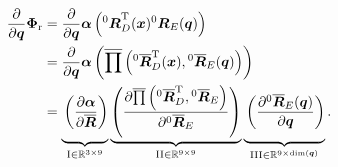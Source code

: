 \documentclass[robotics,article,submit,moreauthors,pdftex]{Definitions/mdpi}
\newcommand{\bm}[1]{\boldsymbol{#1}}
\newcommand{\rotmat}[2]{{{ }^{#1}\boldsymbol{R}}_{#2}}
\newcommand{\rotmato}[2]{{{ }^{#1}\boldsymbol{\overline{R}}}_{#2}}
\newcommand{\transp}[0]{{\mathrm{T}}}
\begin{document}
\begin{align}
\frac{\partial}{\partial \bm{q}}\bm{\Phi}_{\mathrm{r}}
&=
\frac{\partial}{\partial \bm{q}} \bm{\alpha}\left(\rotmat{0}{D}^\transp(\bm{x}) \rotmat{0}{E}(\bm{q})\right) \label{equ:grad_Phi_q}\\
&=
\frac{\partial}{\partial \bm{q}} \bm{\alpha}\left(\overline{\prod}\left( \rotmato{0}{D}^\transp(\bm{x}), \rotmato{0}{E}(\bm{q})\right)\right) \nonumber \\
&=
\underbrace{\vphantom{\left(\frac{\partial \overline{\prod}\left(\rotmato{0}{D}^\transp, \rotmato{0}{E}\right)}{\partial \rotmato{0}{E}}\right)}\left(\frac{\partial \bm{\alpha}}{\partial \overline{\bm{R}}}\right)}_{\mathrm{I} \in {\mathbb{R}}^{3 \times 9}}
\underbrace{\left(\frac{\partial \overline{\prod}\left(\rotmato{0}{D}^\transp, \rotmato{0}{E}\right)}{\partial \rotmato{0}{E}}\right)}_{\mathrm{II} \in {\mathbb{R}}^{9 \times 9}}
\underbrace{\vphantom{\left(\frac{\partial \overline{\prod}\left(\rotmato{0}{D}^\transp, \rotmato{0}{E}\right)}{\partial \rotmato{0}{E}}\right)}\left(\frac{\partial \rotmato{0}{E}(\bm{q})}{\partial \bm{q}} \right)}_{\mathrm{III} \in {\mathbb{R}}^{9 \times \mathrm{dim}(\bm{q})}}.  \nonumber
\end{align}
\end{document}

